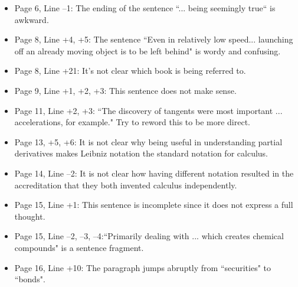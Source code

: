 \documentclass[11pt]{article}
\begin{document}
\begin{itemize}
\begin{itemize}
		\item Page 6, Line --1: The ending of the sentence ``... being seemingly true`` is awkward.
		\item Page 8, Line +4, +5: The sentence ``Even in relatively low speed... launching off an already moving object is to be left behind" is wordy and confusing.
		\item Page 8, Line +21: It's not clear which book is being referred to.
		\item Page 9, Line +1, +2, +3: This sentence does not make sense.
		\item Page 11, Line +2, +3: ``The discovery of tangents were most important ... accelerations, for example." Try to reword this to be more direct.
		\item Page 13, +5, +6: It is not clear why being useful in understanding partial derivatives makes Leibniz notation the standard notation for calculus.
		\item Page 14, Line --2: It is not clear how having different notation resulted in the accreditation that they both invented calculus independently.
		\item Page 15, Line +1: This sentence is incomplete since it does not express a full thought.
		\item Page 15, Line --2, --3, --4:``Primarily dealing with ... which creates chemical compounds" is a sentence fragment.
		\item Page 16, Line +10: The paragraph jumps abruptly from ``securities" to ``bonds".
	\end{itemize}
	

\end{itemize}
\end{document}
